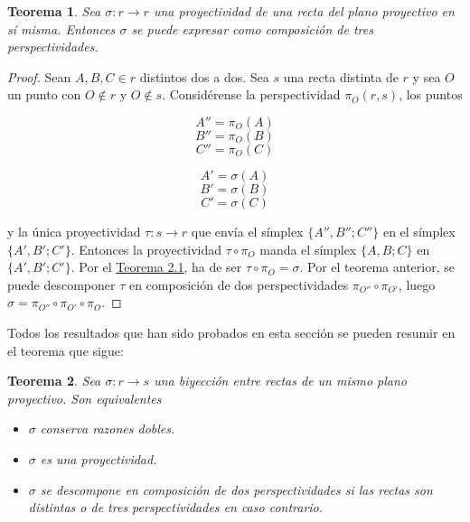 \documentclass[12pt]{report}
\newtheorem{theorem}{Teorema}[chapter]
\theoremstyle{definition}
\theoremstyle{definition}
\theoremstyle{remark}
\begin{document}
\begin{theorem}
\label{teo2.7.}
Sea $\sigma \colon r \to r$ una proyectividad de una recta del plano proyectivo en sí misma. Entonces $\sigma$ se puede expresar como composición de tres perspectividades.
\end{theorem}

\begin{proof}
Sean $A,B,C \in r$ distintos dos a dos. Sea $s$ una recta distinta de $r$ y sea $O$ un punto con $O \notin r$ y $O \notin s$. Considérense la perspectividad $\pi_O(r,s)$, los puntos

\vspace{-4mm}

\setlength{\columnsep}{0cm}
\setlength{\columnseprule}{0pt}

\begin{multicols}{2}

\[A'' = \pi_O(A)\]
\[B'' = \pi_O(B)\]
\[C'' = \pi_O(C)\]

\columnbreak

\[A' = \sigma(A)\]
\[B' = \sigma(B)\]
\[C' = \sigma(C)\]

\end{multicols}
\noindent y la única proyectividad $\tau \colon s \to r$ que envía el símplex $\{A'',B'';C''\}$ en el símplex $\{A',B';C'\}$. Entonces la proyectividad $\tau \circ \pi_O$ manda el símplex $\{A,B;C\}$ en $\{A',B';C'\}$. Por el \hyperref[teo2.1.]{\color{blue}Teorema 2.1}, ha de ser $\tau \circ \pi_O = \sigma$. Por el teorema anterior, se puede descomponer $\tau$ en composición de dos perspectividades $\pi_{O''} \circ \pi_{O'}$, luego $\sigma = \pi_{O''} \circ \pi_{O'} \circ \pi_O$.
\end{proof}

Todos los resultados que han sido probados en esta sección se pueden resumir en el teorema que sigue:

\begin{theorem}
\label{teo2.8.}
Sea $\sigma \colon r \to s$ una biyección entre rectas de un mismo plano proyectivo. Son equivalentes
\begin{itemize}
    \item[(i)] $\sigma$ conserva razones dobles.
    \item[(ii)] $\sigma$ es una proyectividad.
    \item[(iii)] $\sigma$ se descompone en composición de dos perspectividades si las rectas son distintas o de tres perspectividades en caso contrario.
\end{itemize}
\end{theorem}
\end{document}
